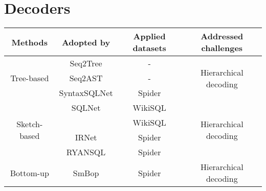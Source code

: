 \section{Decoders}

\begin{table}
    \centering
    \begin{tabular}{|c|c|c|c|}
        \hline
        \rowcolor{Gray}
        \textbf{Methods}                                           & \textbf{Adopted by} & \textbf{Applied datasets} & \textbf{Addressed challenges}                                                            \\
        \hline
        \multirow{3}{*}{Tree-based}                                & Seq2Tree            & -                         & \multirow{3}{*}{Hierarchical decoding}                                                   \\
                                                                   & Seq2AST             & -                         &                                                                                          \\
                                                                   & SyntaxSQLNet        & Spider                    &                                                                                          \\
        \hline
        \multirow{4}{*}{Sketch-based}                              & SQLNet              & WikiSQL                   & \multirow{4}{*}{Hierarchical decoding}                                                   \\
                                                                   &                     & WikiSQL                   &                                                                                          \\
                                                                   & IRNet               & Spider                    &                                                                                          \\
                                                                   & RYANSQL             & Spider                    &                                                                                          \\
        \hline
        Bottom-up                                                  & SmBop               & Spider                    & Hierarchical decoding                                                                    \\

\end{tabular}
\end{table}
